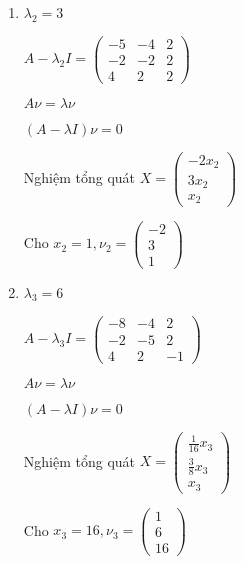 \documentclass[12pt]{article}
\begin{document}
\begin{enumerate}
\begin{enumerate}
              \item $\lambda_2 = 3$

                    $A-\lambda_2 I = \begin{pmatrix}
                            -5 & -4 & 2 \\
                            -2 & -2 & 2 \\
                            4  & 2  & 2
                        \end{pmatrix} $

                    $A\nu = \lambda \nu$

                    $(A-\lambda I )\nu = 0$

                    Nghiệm tổng quát $X= \begin{pmatrix} -2x_2 \\ 3x_2 \\ x_2 \end{pmatrix}$

                    Cho $x_2 = 1, \nu_2 = \begin{pmatrix} -2 \\ 3 \\ 1 \end{pmatrix}$

              \item $\lambda_3 = 6$

                    $A-\lambda_3 I = \begin{pmatrix}
                            -8 & -4 & 2  \\
                            -2 & -5 & 2  \\
                            4  & 2  & -1
                        \end{pmatrix} $

                    $A\nu = \lambda \nu$

                    $(A-\lambda I )\nu = 0$

                    Nghiệm tổng quát $X= \begin{pmatrix} \frac{1}{16} x_3 \\ \frac{3}{8}x_3 \\ x_3 \end{pmatrix}$

                    Cho $x_3 = 16, \nu_3 = \begin{pmatrix} 1 \\ 6 \\ 16 \end{pmatrix}$
          \end{enumerate}
\end{enumerate}
\end{document}
